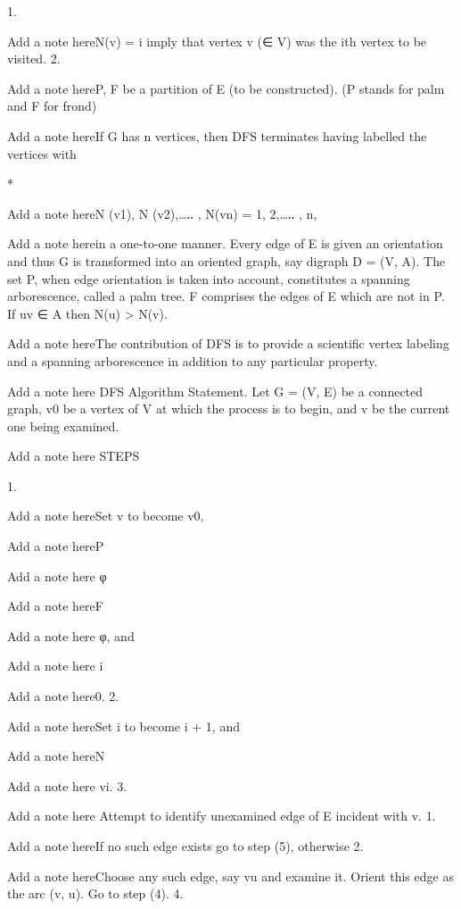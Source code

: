    1.

      Add a note hereN(v) = i imply that vertex v (∈ V) was the ith vertex to be visited.
   2.

      Add a note hereP, F be a partition of E (to be constructed). (P stands for palm and F for frond)

Add a note hereIf G has n vertices, then DFS terminates having labelled the vertices with

    *

      Add a note here{N (v1), N (v2),…‥ , N(vn)} = {1, 2,…‥ , n},

Add a note herein a one-to-one manner. Every edge of E is given an orientation and thus G is transformed into an oriented graph, say digraph D = (V, A). The set P, when edge orientation is taken into account, constitutes a spanning arborescence, called a palm tree. F comprises the edges of E which are not in P. If uv ∈ A then N(u) > N(v).

Add a note hereThe contribution of DFS is to provide a scientific vertex labeling and a spanning arborescence in addition to any particular property.

Add a note here DFS Algorithm Statement. Let G = (V, E) be a connected graph, v0 be a vertex of V at which the process is to begin, and v be the current one being examined.

Add a note here STEPS

   1.

      Add a note hereSet v to become v0,

      Add a note hereP
      	

      Add a note here φ

      Add a note hereF
      	

      Add a note here φ, and

      Add a note here i
      	

      Add a note here0.
   2.

      Add a note hereSet i to become i + 1, and

      Add a note hereN
      	

      Add a note here vi.
   3.

      Add a note here Attempt to identify unexamined edge of E incident with v.
         1.

            Add a note hereIf no such edge exists go to step (5), otherwise
         2.

            Add a note hereChoose any such edge, say vu and examine it. Orient this edge as the arc (v, u). Go to step (4).
   4.

